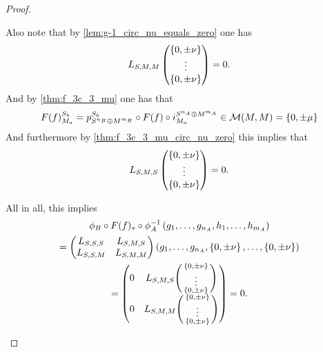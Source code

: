 \begin{proof}
\begin{enumerate}
{            Also note that by \autoref{lem:g-1_circ_nu_equals_zero} one has
            \[
                L_{S, M, M}
                \begin{pmatrix}
                    \left\{ 0, \pm \nu \right\} \\
                    \vdots \\
                    \left\{ 0, \pm \nu \right\}
                \end{pmatrix} = 0.
            \]
            And by \autoref{thm:f_3c_3_mu} one has that
            \[
                F(f)_{M_a}^{S_b} = p_{S^{n_B} \oplus M^{m_B}}^{S_b} \circ F(f) \circ i_{M_a}^{S^{n_A} \oplus M^{m_A}} \in {\mathcal{M}}(M, M) = \left\{ 0, \pm \mu \right\}
            \]
            And furthermore by \autoref{thm:f_3c_3_mu_circ_nu_zero} this implies that
            \[
                L_{S, M, S}
                \begin{pmatrix}
                    \left\{ 0, \pm \nu \right\} \\
                    \vdots \\
                    \left\{ 0, \pm \nu \right\}
                \end{pmatrix} = 0.
            \]

            All in all, this implies
            \begin{multline*}
                \phi_B \circ F(f)_* \circ \phi_A^{-1} \left( g_1, \dots, g_{n_A}, h_1, \dots, h_{m_A} \right) \\
                =
                \begin{pmatrix}
                    L_{S, S, S} & L_{S, M, S} \\
                    L_{S, S, M} & L_{S, M, M}
                \end{pmatrix}
                \left( g_1, \dots, g_{n_A}, \left\{ 0, \pm \nu \right\}, \dots, \left\{ 0, \pm \nu \right\} \right) \\
                =
                \begin{pmatrix}
                    0 & L_{S, M, S}
                    \begin{psmallmatrix}
                        \left\{ 0, \pm \nu \right\} \\
                        \vdots \\
                        \left\{ 0, \pm \nu \right\}
                    \end{psmallmatrix} \\
                    0 & L_{S, M, M}
                    \begin{psmallmatrix}
                        \left\{ 0, \pm \nu \right\} \\
                        \vdots \\
                        \left\{ 0, \pm \nu \right\}
                    \end{psmallmatrix} \\
                \end{pmatrix} 
                = 0.
            \end{multline*}

}
\end{enumerate}
\end{proof}
